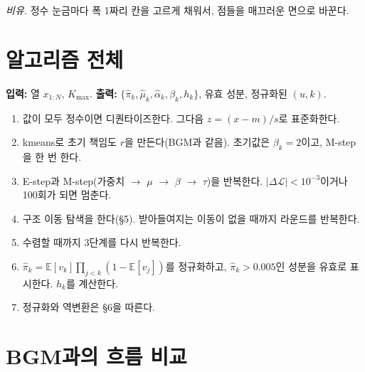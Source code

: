 \documentclass[11pt]{article}
\newcommand{\E}{\mathbb{E}}
\begin{document}
\emph{비유.} 정수 눈금마다 폭 1짜리 칸을 고르게 채워서, 점들을 매끄러운 면으로 바꾼다.

\section{알고리즘 전체}

\noindent\textbf{입력:} 열 $x_{1:N}$, $K_{\max}$. \quad \textbf{출력:} $\{\hat\pi_k,\hat\mu_k,\hat\alpha_k,\beta_k,h_k\}$, 유효 성분, 정규화된 $(u,k)$.
\begin{enumerate}
  \item 값이 모두 정수이면 디퀀타이즈한다. 그다음 $z=(x-m)/s$로 표준화한다.
  \item kmeans로 초기 책임도 $r$을 만든다(BGM과 같음). 초기값은 $\beta_k=2$이고, M-step을 한 번 한다.
  \item E-step과 M-step(가중치 $\to$ $\mu$ $\to$ $\beta$ $\to$ $\tau$)을 반복한다. $|\Delta\mathcal{L}|<10^{-3}$이거나 100회가 되면 멈춘다.
  \item 구조 이동 탐색을 한다(\S5). 받아들여지는 이동이 없을 때까지 라운드를 반복한다.
  \item 수렴할 때까지 3단계를 다시 반복한다.
  \item $\hat\pi_k=\E[v_k]\prod_{j<k}(1-\E[v_j])$를 정규화하고, $\hat\pi_k>0.005$인 성분을 유효로 표시한다. $h_k$를 계산한다.
  \item 정규화와 역변환은 \S6을 따른다.
\end{enumerate}

\section{BGM과의 흐름 비교}
\end{document}
